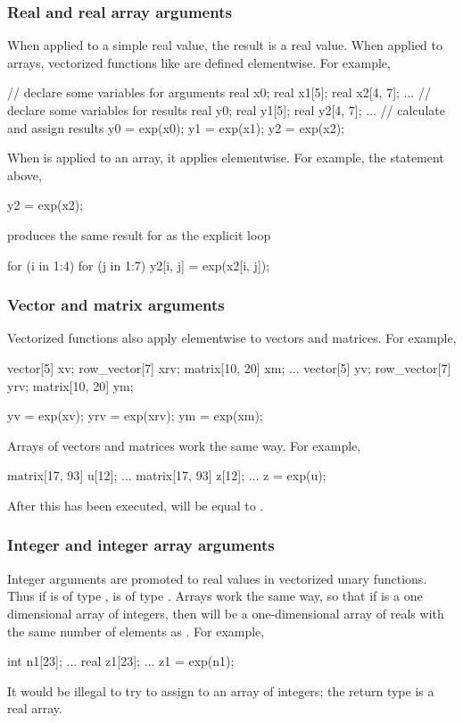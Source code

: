 \subsubsection{Real and real array arguments}

When applied to a simple real value, the result is a real value.  When
applied to arrays, vectorized functions like  are defined
elementwise.  For example,
%
\begin{stancode}
// declare some variables for arguments
real x0;
real x1[5];
real x2[4, 7];
...
// declare some variables for results
real y0;
real y1[5];
real y2[4, 7];
...
// calculate and assign results
y0 = exp(x0);
y1 = exp(x1);
y2 = exp(x2);
\end{stancode}
%
When  is applied to an array, it applies elementwise.  For
example, the statement above,
%
\begin{stancode}
y2 = exp(x2);
\end{stancode}
%
produces the same result for  as the explicit loop
%
\begin{stancode}
for (i in 1:4)
  for (j in 1:7)
    y2[i, j] = exp(x2[i, j]);
\end{stancode}
%

\subsubsection{Vector and matrix arguments}

Vectorized functions also apply elementwise to vectors and matrices.
For example,
%
\begin{stancode}
vector[5] xv;
row_vector[7] xrv;
matrix[10, 20] xm;
...
vector[5] yv;
row_vector[7] yrv;
matrix[10, 20] ym;

yv = exp(xv);
yrv = exp(xrv);
ym = exp(xm);
\end{stancode}
%

Arrays of vectors and matrices work the same way.  For example,
%
\begin{stancode}
matrix[17, 93] u[12];
...
matrix[17, 93] z[12];
...
z = exp(u);
\end{stancode}
%
After this has been executed,  will be equal to
.


\subsubsection{Integer and integer array arguments}

Integer arguments are promoted to real values in vectorized unary
functions.  Thus if  is of type ,  is of
type .  Arrays work the same way, so that if  is a
one dimensional array of integers, then  will be a
one-dimensional array of reals with the same number of elements as
.  For example,
%
\begin{stancode}
int n1[23];
...
real z1[23];
...
z1 = exp(n1);
\end{stancode}
%
It would be illegal to try to assign  to an array of
integers; the return type is a real array.


